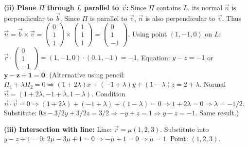 \documentclass[11pt]{article}
\begin{document}
\begin{exoresolu}
\textbf{(ii) Plane $\Pi$ through $L$ parallel to $\vec{v}$:} Since $\Pi$ contains $L$, its normal $\vec{n}$ is perpendicular to $\vec{b}$. Since $\Pi$ is parallel to $\vec{v}$, $\vec{n}$ is also perpendicular to $\vec{v}$. Thus $\vec{n} = \vec{b} \times \vec{v} = \begin{pmatrix} 0 \\ 1 \\ 1 \end{pmatrix} \times \begin{pmatrix} 1 \\ 1 \\ 1 \end{pmatrix} = \begin{pmatrix} 0 \\ 1 \\ -1 \end{pmatrix}$.
Using point $(1,-1,0)$ on $L$: $\vec{r}\cdot\begin{pmatrix} 0 \\ 1 \\ -1 \end{pmatrix} = (1,-1,0)\cdot(0,1,-1) = -1$.
Equation: $y - z = -1$ or $\mathbf{y - z + 1 = 0}$.
(Alternative using pencil: $\Pi_1 + \lambda\Pi_2 = 0 \Rightarrow (1+2\lambda)x + (-1+\lambda)y + (1-\lambda)z = 2+\lambda$. Normal $\vec{n} = (1+2\lambda, -1+\lambda, 1-\lambda)$. Condition $\vec{n}\cdot\vec{v}=0 \Rightarrow (1+2\lambda)+(-1+\lambda)+(1-\lambda)=0 \Rightarrow 1+2\lambda=0 \Rightarrow \lambda=-1/2$. Substitute: $0x -3/2 y + 3/2 z = 3/2 \Rightarrow -y+z=1 \Rightarrow y-z=-1$. Same result.)

\textbf{(iii) Intersection with line:} Line: $\vec{r} = \mu(1,2,3)$. Substitute into $y-z+1=0$: $2\mu - 3\mu + 1 = 0 \Rightarrow -\mu + 1 = 0 \Rightarrow \mu = 1$.
Point: $(1,2,3)$.
\end{exoresolu}
\end{document}
